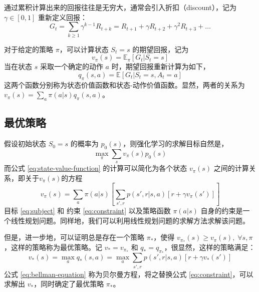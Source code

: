 通过累积计算出来的回报往往是无穷大，通常会引入折扣（discount），记为$\gamma \in [0,1]$ 重新定义回报：
\begin{equation}
    G_t = \sum_{k \geq 1} \gamma^{k-1} R_{t+k} = R_{t+1} + \gamma R_{t+2} + \gamma^2 R_{t+3} + \dots
    \label{eq:return}
\end{equation}

对于给定的策略 $\pi$，可以计算状态 $S_t = s$ 的期望回报，记为
\begin{equation}
    v_\pi (s) = \mathbb{E}_\pi [G_t | S_t = s]
    \label{eq:state-value-function}
\end{equation}
当在状态 $s$ 采取一个确定的动作 $a$ 时，期望回报重新计算为如下，
\begin{equation}
    q_\pi(s, a) = \mathbb{E} [G_t | S_t = s, A_t = a]
    \label{eq:action-value-function}
\end{equation}
这两个函数分别称为状态价值函数和状态-动作价值函数。显然，两者的关系为 $ v_\pi(s) = \sum_{a} \pi(a|s) q_{\pi} (s, a)$。

\subsection{最优策略}
假设初始状态 $S_0 = s$ 的概率为 $p_0(s)$，则强化学习的求解目标自然是，
\begin{equation}
    \max_\pi \sum_s v_\pi(s) p_0(s)
    \label{eq:subject}
\end{equation}
而公式 \ref{eq:state-value-function} 的计算可以简化为各个状态 $v_\pi(s)$ 之间的计算关系，即关于$v_\pi(s)$的方程
\begin{equation}
    v_\pi (s) = \sum_a \pi(a|s) \left[ \sum_{s', r} p(s', r | s, a)  [r + \gamma v_\pi(s')] \right]
    \label{eq:constraint}
\end{equation}
目标 \ref{eq:subject} 和 约束 \ref{eq:constraint} 以及策略函数 $\pi(a|s)$ 自身的约束是一个线性规划问题。同样地，我们可以利用线性规划问题的求解方法求解该问题。

但是，进一步地，可以证明\cite{suttonReinforcementLearningIntroduction2018}总是存在一个策略 $\pi_*$，使得 $v_{\pi_*}(s) \geq v_\pi(s), \; \forall s,\pi$，这样的策略称为最优策略。记 $v_* = v_{\pi_*}$ 和 $q_* = q_{\pi_*}$，很显然，这样的策略满足：
\begin{equation}
    v_*(s) = \max_{a} q_*(s, a) = \max_a \sum_{s', r} p(s', r | s, a) \left[r + \gamma v_*(s') \right]
    \label{eq:bellman-equation}
\end{equation}
公式 \ref{eq:bellman-equation} 称为贝尔曼方程，将之替换公式 \ref{eq:constraint}，可以求解出 $v_*$，同时确定了最优策略 $\pi_*$。

